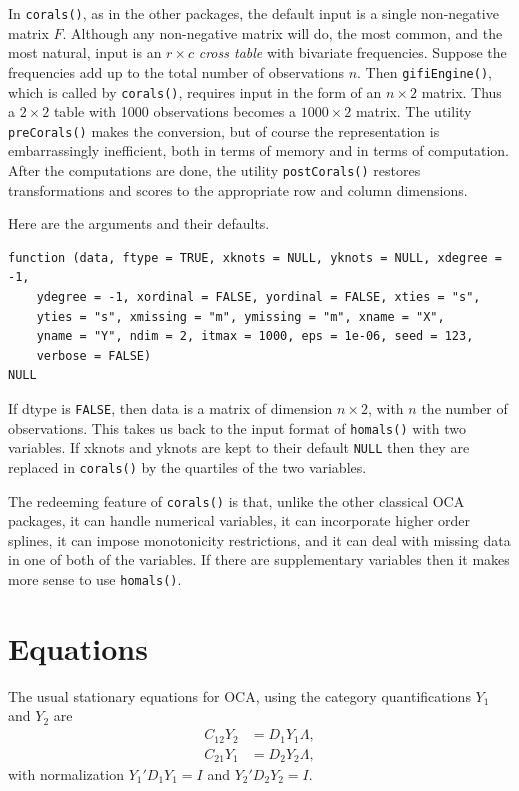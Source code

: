 \documentclass[
  12pt,
  letterpaper,
  DIV=11,
  numbers=noendperiod]{scrreprt}
\begin{document}
In \texttt{corals()}, as in the other packages, the default input is a
single non-negative matrix \(F\). Although any non-negative matrix will
do, the most common, and the most natural, input is an \(r\times c\)
\emph{cross table} with bivariate frequencies. Suppose the frequencies
add up to the total number of observations \(n\). Then
\texttt{gifiEngine()}, which is called by \texttt{corals()}, requires
input in the form of an \(n\times 2\) matrix. Thus a \(2\times 2\) table
with 1000 observations becomes a \(1000\times 2\) matrix. The utility
\texttt{preCorals()} makes the conversion, but of course the
representation is embarrassingly inefficient, both in terms of memory
and in terms of computation. After the computations are done, the
utility \texttt{postCorals()} restores transformations and scores to the
appropriate row and column dimensions.

Here are the arguments and their defaults.

\begin{verbatim}
function (data, ftype = TRUE, xknots = NULL, yknots = NULL, xdegree = -1, 
    ydegree = -1, xordinal = FALSE, yordinal = FALSE, xties = "s", 
    yties = "s", xmissing = "m", ymissing = "m", xname = "X", 
    yname = "Y", ndim = 2, itmax = 1000, eps = 1e-06, seed = 123, 
    verbose = FALSE) 
NULL
\end{verbatim}

If dtype is \texttt{FALSE}, then data is a matrix of dimension
\(n\times 2\), with \(n\) the number of observations. This takes us back
to the input format of \texttt{homals()} with two variables. If xknots
and yknots are kept to their default \texttt{NULL} then they are
replaced in \texttt{corals()} by the quartiles of the two variables.

The redeeming feature of \texttt{corals()} is that, unlike the other
classical OCA packages, it can handle numerical variables, it can
incorporate higher order splines, it can impose monotonicity
restrictions, and it can deal with missing data in one of both of the
variables. If there are supplementary variables then it makes more sense
to use \texttt{homals()}.

\section{Equations}\label{equations-1}

The usual stationary equations for OCA, using the category
quantifications \(Y_1\) and \(Y_2\) are \begin{align*}
C_{12}Y_2&=D_1Y_1\Lambda,\\
C_{21}Y_1&=D_2Y_2\Lambda,
\end{align*} with normalization \(Y_1'D_1Y_1=I\) and \(Y_2'D_2Y_2=I\).
\end{document}
